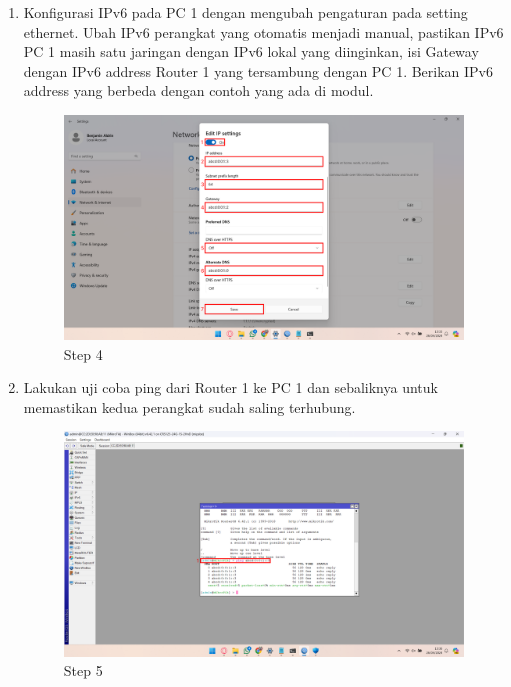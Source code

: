 \begin{center}
\begin{enumerate}
        \item Konfigurasi IPv6 pada PC 1 dengan mengubah pengaturan pada setting ethernet. Ubah IPv6 perangkat yang otomatis menjadi manual, pastikan IPv6 PC 1 masih satu jaringan dengan IPv6 lokal yang diinginkan, isi Gateway dengan IPv6 address Router 1 yang tersambung dengan PC 1. Berikan IPv6 address yang berbeda dengan contoh yang ada di modul.
        \begin{figure}[H]
			\centering
			\includegraphics[width=0.8\linewidth]{P5/img/pc1/Step 4.png}
			\caption{Step 4}
			\label{fig:Step 4(PC 1)}
		\end{figure}

        \item Lakukan uji coba ping dari Router 1 ke PC 1 dan sebaliknya untuk memastikan kedua perangkat sudah saling terhubung.
        \begin{figure}[H]
			\centering
			\includegraphics[width=0.8\linewidth]{P5/img/pc1/Step 5.png}
			\caption{Step 5}
			\label{fig:Step 5(PC 1)}
		\end{figure}


\end{enumerate}
\end{center}
